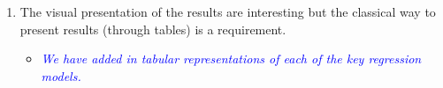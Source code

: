 \begin{enumerate}
\item The visual presentation of the results are interesting but the classical way to present results (through tables) is a requirement.

\begin{itemize}
\item \textcolor{blue}{\emph{
	We have added in tabular representations of each of the key regression models. 
}}
\end{itemize}



\end{enumerate}